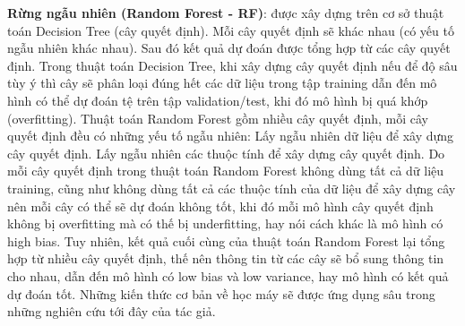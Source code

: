 \textbf{Rừng ngẫu nhiên (Random Forest - RF)}: được xây dựng trên cơ sở thuật toán Decision Tree (cây quyết định). Mỗi cây quyết định sẽ khác nhau (có yếu tố ngẫu nhiên khác nhau). Sau đó kết quả dự đoán được tổng hợp từ các cây quyết định. Trong thuật toán Decision Tree, khi xây dựng cây quyết định nếu để độ sâu tùy ý thì cây sẽ phân loại đúng hết các dữ liệu trong tập training dẫn đến mô hình có thể dự đoán tệ trên tập validation/test, khi đó mô hình bị quá khớp (overfitting).
Thuật toán Random Forest gồm nhiều cây quyết định, mỗi cây quyết định đều có những yếu tố ngẫu nhiên:
Lấy ngẫu nhiên dữ liệu để xây dựng cây quyết định.
Lấy ngẫu nhiên các thuộc tính để xây dựng cây quyết định.
Do mỗi cây quyết định trong thuật toán Random Forest không dùng tất cả dữ liệu training, cũng như không dùng tất cả các thuộc tính của dữ liệu để xây dựng cây nên mỗi cây có thể sẽ dự đoán không tốt, khi đó mỗi mô hình cây quyết định không bị overfitting mà có thế bị underfitting, hay nói cách khác là mô hình có high bias. Tuy nhiên, kết quả cuối cùng của thuật toán Random Forest lại tổng hợp từ nhiều cây quyết định, thế nên thông tin từ các cây sẽ bổ sung thông tin cho nhau, dẫn đến mô hình có low bias và low variance, hay mô hình có kết quả dự đoán tốt.
	Những kiến thức cơ bản về học máy sẽ được ứng dụng sâu trong những nghiên cứu tới đây của tác giả.

